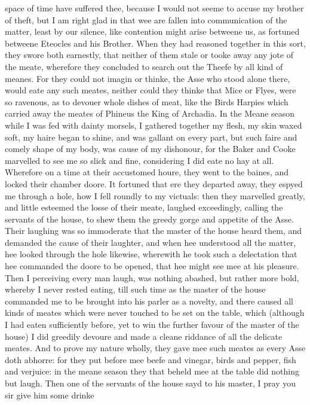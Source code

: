space of time have suffered thee, because I would not seeme to accuse my
brother of theft, but I am right glad in that wee are fallen into communication
of the matter, least by our silence, like contention might arise betweene us,
as fortuned betweene Eteocles and his Brother. When they had reasoned together
in this sort, they swore both earnestly, that neither of them stale or tooke
away any jote of the meate, wherefore they concluded to search out the Theefe
by all kind of meanes. For they could not imagin or thinke, the Asse who stood
alone there, would eate any such meates, neither could they thinke that Mice or
Flyes, were so ravenous, as to devouer whole dishes of meat, like the Birds
Harpies which carried away the meates of Phineus the King of Archadia. In the
Meane season while I was fed with dainty morsels, I gathered together my flesh,
my skin waxed soft, my haire began to shine, and was gallant on every part, but
such faire and comely shape of my body, was cause of my dishonour, for the
Baker and Cooke marvelled to see me so slick and fine, considering I did eate
no hay at all. Wherefore on a time at their accustomed houre, they went to the
baines, and locked their chamber doore. It fortuned that ere they departed
away, they espyed me through a hole, how I fell roundly to my victuals: then
they marvelled greatly, and little esteemed the losse of their meate, laughed
exceedingly, calling the servants of the house, to shew them the greedy gorge
and appetite of the Asse. Their laughing was so immoderate that the master of
the house heard them, and demanded the cause of their laughter, and when hee
understood all the matter, hee looked through the hole likewise, wherewith he
took such a delectation that hee commanded the doore to be opened, that hee
might see mee at his pleasure. Then I perceiving every man laugh, was nothing
abashed, but rather more bold, whereby I never rested eating, till such time as
the master of the house commanded me to be brought into his parler as a
novelty, and there caused all kinds of meates which were never touched to be
set on the table, which (although I had eaten sufficiently before, yet to win
the further favour of the master of the house) I did greedily devoure and made
a cleane riddance of all the delicate meates. And to prove my nature wholly,
they gave mee such meates as every Asse doth abhorre: for they put before mee
beefe and vinegar, birds and pepper, fish and verjuice: in the meane season
they that beheld mee at the table did nothing but laugh. Then one of the
servants of the house sayd to his master, I pray you sir give him some drinke
